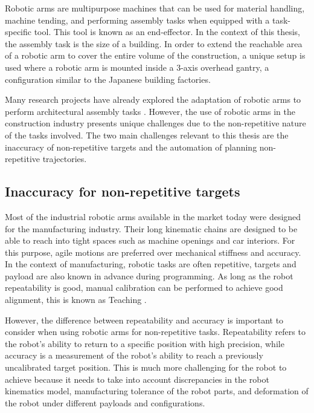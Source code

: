 Robotic arms are multipurpose machines that can be used for material handling, machine tending, and performing assembly tasks when equipped with a task-specific tool. This tool is known as an end-effector. In the context of this thesis, the assembly task is the size of a building. In order to extend the reachable area of a robotic arm to cover the entire volume of the construction, a unique setup is used where a robotic arm is mounted inside a 3-axis overhead gantry, a configuration similar to the Japanese building factories.

Many research projects have already explored the adaptation of robotic arms to perform architectural assembly tasks . However, the use of robotic arms in the construction industry presents unique challenges due to the non-repetitive nature of the tasks involved. The two main challenges relevant to this thesis are the inaccuracy of non-repetitive targets and the automation of planning non-repetitive trajectories.

\subsection{Inaccuracy for non-repetitive targets}
\label{subsection:introduction-inaccuracy-for-non-repetitive-targets}

Most of the industrial robotic arms available in the market today were designed for the manufacturing industry. Their long kinematic chains are designed to be able to reach into tight spaces such as machine openings and car interiors. For this purpose, agile motions are preferred over mechanical stiffness and accuracy. In the context of manufacturing, robotic tasks are often repetitive, targets and payload are also known in advance during programming. As long as the robot repeatability is good, manual calibration can be performed to achieve good alignment, this is known as Teaching  \parencite{shohamRobotTeachingMethods1984}.

However, the difference between repeatability and accuracy is important to consider when using robotic arms for non-repetitive tasks. Repeatability refers to the robot's ability to return to a specific position with high precision, while accuracy is a measurement of the robot's ability to reach a previously uncalibrated target position. This is much more challenging for the robot to achieve because it needs to take into account discrepancies in the robot kinematics model, manufacturing tolerance of the robot parts, and deformation of the robot under different payloads and configurations. 

